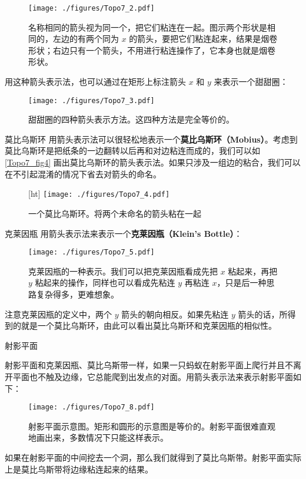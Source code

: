 \begin{figure}[ht]
\centering
\texttt{[image: ./figures/Topo7\_2.pdf]}
\caption{名称相同的箭头视为同一个，把它们粘连在一起。图示两个形状是相同的，左边的有两个同为 $x$ 的箭头，要把它们粘连起来，结果是烟卷形状；右边只有一个箭头，不用进行粘连操作了，它本身也就是烟卷形状。} \label{Topo7_fig2}
\end{figure}

用这种箭头表示法，也可以通过在矩形上标注箭头 $x$ 和 $y$ 来表示一个甜甜圈：

\begin{figure}[ht]
\centering
\texttt{[image: ./figures/Topo7\_3.pdf]}
\caption{甜甜圈的四种箭头表示方法。这四种方法是完全等价的。} \label{Topo7_fig3}
\end{figure}

\begin{example}{莫比乌斯环}
用箭头表示法可以很轻松地表示一个\textbf{莫比乌斯环（Mobius）}。考虑到莫比乌斯环是把纸条的一边翻转以后再和对边粘连而成的，我们可以如\autoref{Topo7_fig4} 画出莫比乌斯环的箭头表示法。如果只涉及一组边的粘合，我们可以在不引起混淆的情况下省去对箭头的命名。

\begin{figure}\label{Topo7_fig6}[ht]
\centering
\texttt{[image: ./figures/Topo7\_4.pdf]}
\caption{一个莫比乌斯环。将两个未命名的箭头粘在一起} \label{Topo7_fig4}
\end{figure}

\end{example}



\begin{example}{克莱因瓶}
用箭头表示法来表示一个\textbf{克莱因瓶（Klein's Bottle）}：
\begin{figure}[ht]
\centering
\texttt{[image: ./figures/Topo7\_5.pdf]}
\caption{克莱因瓶的一种表示。我们可以把克莱因瓶看成先把 $x$ 粘起来，再把 $y$ 粘起来的操作，同样也可以看成先粘连 $y$ 再粘连 $x$，只是后一种思路复杂得多，更难想象。} \label{Topo7_fig5}
\end{figure}

注意克莱因瓶的定义中，两个 $y$ 箭头的朝向相反。如果先粘连 $y$ 箭头的话，所得到的就是一个莫比乌斯环，由此可以看出莫比乌斯环和克莱因瓶的相似性。

\end{example}

\begin{example}{射影平面}

射影平面和克莱因瓶、莫比乌斯带一样，如果一只蚂蚁在射影平面上爬行并且不离开平面也不触及边缘，它总能爬到出发点的对面。用箭头表示法来表示射影平面如下：

\begin{figure}[ht]
\centering
\texttt{[image: ./figures/Topo7\_8.pdf]}
\caption{射影平面示意图。矩形和圆形的示意图是等价的。射影平面很难直观地画出来，多数情况下只能这样表示。} \label{Topo7_fig8}
\end{figure}

如果在射影平面的中间挖去一个洞，那么我们就得到了莫比乌斯带。射影平面实际上是莫比乌斯带将边缘粘连起来的结果。

\end{example}

